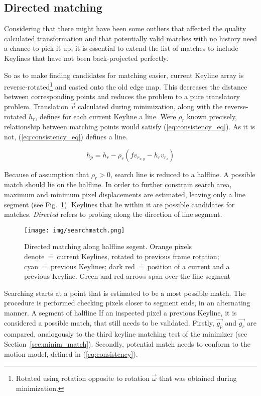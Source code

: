 \subsection{Directed matching}


Considering that there might have been some outliers that affected the quality calculated transformation and that potentially valid matches with no history need a chance to pick it up, it is essential to extend the list of matches to include Keylines that have not been back-projected perfectly.

So as to make finding candidates for matching easier, current Keyline array is reverse-rotated\footnote{Rotated using rotation opposite to rotation $\vec{\omega}$ that was obtained during minimization.} and casted onto the old edge map. This decreases the distance between corresponding points and reduces the problem to a pure translatory problem. Translation $\vec{v}$ calculated during minimization, along with the reverse-rotated $h_r$, defines for each current Keyline a line. Were $\rho_r$ known precisely, relationship between matching points would satisfy (\ref{eq:consistency_eq}). As it is not, (\ref{eq:consistency_eq}) defines a line.

\begin{equation}
h_p = h_r - \rho_{r} \left( fv_{r_{x,y}}-h_{r}v_{r_z} \right)
\label{eq:consistency_eq}
\end{equation}

Because of assumption that $\rho_r > 0$, search line is reduced to a halfline. A possible match should lie on the halfline. In order to further constrain search area, maximum and minimum pixel displacements are estimated, leaving only a line segment (see Fig.~\ref{fig:directed_m}). Keylines that lie within it are possible candidates for matches. \textit{Directed} refers to probing along the direction of line segment.

\begin{figure}[ht]
	\centering\texttt{[image: img/searchmatch.png]}
	\caption{ Directed matching along halfline segent. Orange pixels denote~\==~current Keylines, rotated to previous frame rotation; cyan~\==~previous Keylines; dark red~\==~position of a current and a previous Keyline. Green and red arrows span over the line segment }
	\label{fig:directed_m}
\end{figure}

Searching starts at a point that is estimated to be a most possible match. The procedure is performed checking pixels closer to segment ends, in an alternating manner. A segment of halfline If an inspected pixel a previous Keyline, it is considered a possible match, that still needs to be validated. Firstly, $\vec{g_p}$ and $\vec{g_r}$ are compared, analogously to the third keyline matching test of the minimizer (see Section~\ref{sec:minim_match}). Secondly, potential match needs to conform to the motion model, defined in (\ref{eq:consistency}).

